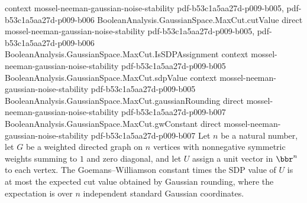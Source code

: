 \begin{theorem}
  {context}
  {mossel-neeman-gaussian-noise-stability}
  {pdf-b53c1a5aa27d-p009-b005,
    pdf-b53c1a5aa27d-p009-b006}
\proofstep
  {BooleanAnalysis.GaussianSpace.MaxCut.cutValue}
  {direct}
  {mossel-neeman-gaussian-noise-stability}
  {pdf-b53c1a5aa27d-p009-b005,
    pdf-b53c1a5aa27d-p009-b006}
\proofstep
  {BooleanAnalysis.GaussianSpace.MaxCut.IsSDPAssignment}
  {context}
  {mossel-neeman-gaussian-noise-stability}
  {pdf-b53c1a5aa27d-p009-b005}
\proofstep
  {BooleanAnalysis.GaussianSpace.MaxCut.sdpValue}
  {context}
  {mossel-neeman-gaussian-noise-stability}
  {pdf-b53c1a5aa27d-p009-b005}
\proofstep
  {BooleanAnalysis.GaussianSpace.MaxCut.gaussianRounding}
  {direct}
  {mossel-neeman-gaussian-noise-stability}
  {pdf-b53c1a5aa27d-p009-b007}
\proofstep
  {BooleanAnalysis.GaussianSpace.MaxCut.gwConstant}
  {direct}
  {mossel-neeman-gaussian-noise-stability}
  {pdf-b53c1a5aa27d-p009-b007}
Let $n$ be a natural number, let $G$ be a weighted directed graph on $n$ vertices with
nonnegative symmetric weights summing to $1$ and zero diagonal, and let $U$ assign a
unit vector in $\bbr^n$ to each vertex. The Goemans–Williamson constant times the SDP
value of $U$ is at most the expected cut value obtained by Gaussian rounding, where the
expectation is over $n$ independent standard Gaussian coordinates.
\end{theorem}

